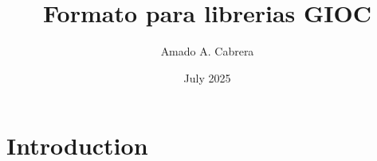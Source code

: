 \documentclass{article}
\title{Formato para librerias GIOC}
\author{Amado A. Cabrera}
\date{July 2025}
\begin{document}
\maketitle

\section{Introduction}
\end{document}
